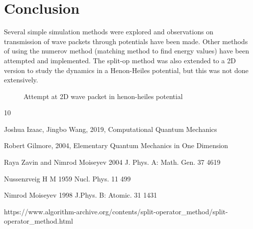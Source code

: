 \documentclass{article}
\begin{document}
\section{Conclusion}
Several simple simulation methods were explored and observations on transmission of wave packets through potentials have been made. Other methods of using the numerov method (matching method to find energy values) have been attempted and implemented.
The split-op method was also extended to a 2D version to study the dynamics in a Henon-Heiles potential, but this was not done extensively. 

\begin{figure}[h!]
\centering
{}
\qquad
{}
\caption{Attempt at 2D wave packet in henon-heiles potential}
\end{figure}

\newpage
\begin{thebibliography} {10}

 Joshua Izaac, Jingbo Wang, 2019, Computational Quantum Mechanics

 Robert Gilmore, 2004, Elementary Quantum Mechanics in One Dimension

  Raya Zavin and Nimrod Moiseyev 2004 J. Phys. A: Math. Gen. 37 4619

  Nussenzveig H M 1959 Nucl. Phys. 11 499 

 Nimrod Moiseyev 1998 J.Phys. B: Atomic. 31 1431

 https://www.algorithm-archive.org/contents/split-operator_method/split-operator_method.html

 
\end{thebibliography}
\end{document}
